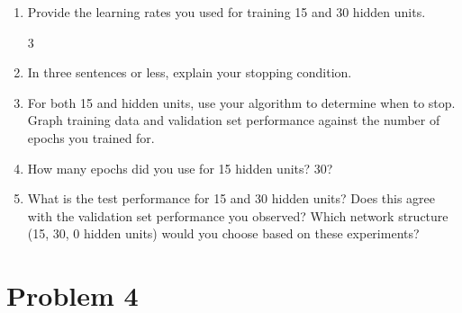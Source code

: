 \documentclass{article}
\begin{document}
\begin{enumerate}
\begin{enumerate}
    \item Provide the learning rates you used for training 15 and 30 hidden units.

      \setcounter{enumii}3

    \item In three sentences or less, explain your stopping condition. 

    \item For both 15 and hidden units, use your algorithm to determine when to stop.
      Graph training data and validation set performance against the number of
      epochs you trained for.

    \item How many epochs did you use for 15 hidden units? 30?

    \item What is the test performance for 15 and 30 hidden units? Does this agree
      with the validation set performance you observed? Which network structure
      (15, 30, 0 hidden units) would you choose based on these experiments?


    \end{enumerate}


  \end{enumerate}

  \section*{Problem 4}
\end{document}
